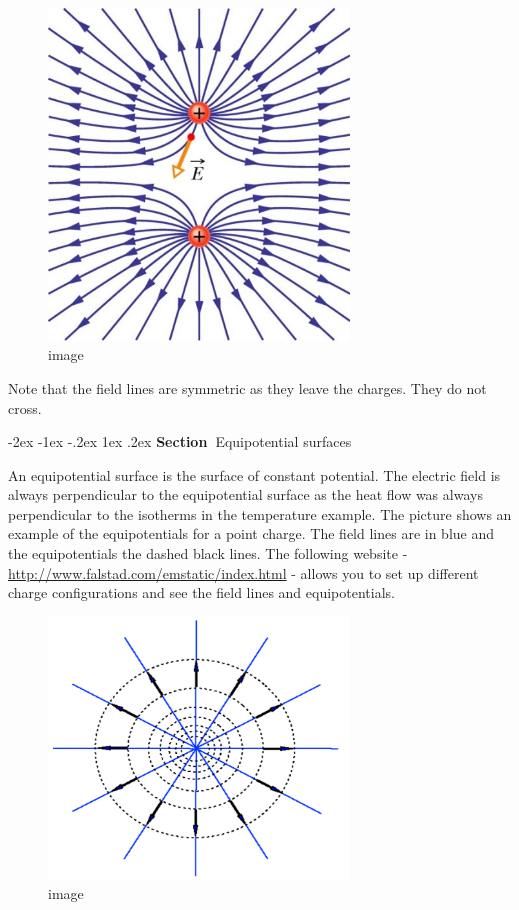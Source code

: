 \documentclass[
]{book}
\makeatletter
\renewcommand\section{%
\@startsection{section}{1}{\z@}%
              {-2ex \@plus -1ex \@minus -.2ex}%
              {1ex \@plus .2ex}%
              {\sffamily\bfseries\large\noindent Section~}}
\numberwithin{equation}{section}
\makeatother
\begin{document}
\begin{figure}
\centering
\includegraphics[width=80mm,height=\textheight]{Figures/Efield_like.jpg}
\caption{image}
\end{figure}

Note that the field lines are symmetric as they leave the charges. They
do not cross.

\hypertarget{equipotential-surfaces}{%
\section{Equipotential surfaces}\label{equipotential-surfaces}}

An equipotential surface is the surface of constant potential. The
electric field is always perpendicular to the equipotential surface as
the heat flow was always perpendicular to the isotherms in the
temperature example. The picture shows an example of the equipotentials
for a point charge. The field lines are in blue and the equipotentials
the dashed black lines. The following website -
\url{http://www.falstad.com/emstatic/index.html} - allows you to set up
different charge configurations and see the field lines and
equipotentials.

\begin{figure}
\centering
\includegraphics[width=80mm,height=\textheight]{Figures/equipotentials.png}
\caption{image}
\end{figure}
\end{document}
